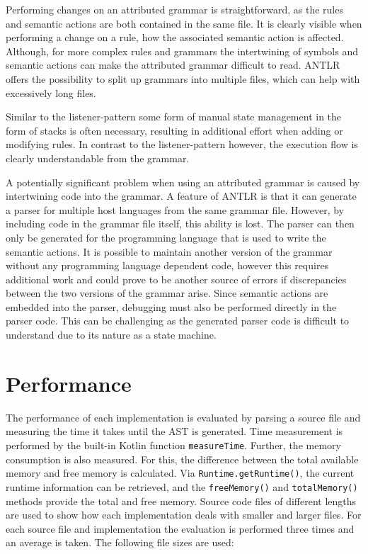 Performing changes on an attributed grammar is straightforward, as the rules and semantic actions are both contained in the same file. It is clearly visible when performing a change on a rule, how the associated semantic action is affected. Although, for more complex rules and grammars the intertwining of symbols and semantic actions can make the attributed grammar difficult to read. ANTLR offers the possibility to split up grammars into multiple files, which can help with excessively long files. 

Similar to the listener-pattern some form of manual state management in the form of stacks is often necessary, resulting in additional effort when adding or modifying rules. In contrast to the listener-pattern however, the execution flow is clearly understandable from the grammar. 

A potentially significant problem when using an attributed grammar is caused by intertwining code into the grammar. A feature of ANTLR is that it can generate a parser for multiple host languages from the same grammar file. However, by including code in the grammar file itself, this ability is lost. The parser can then only be generated for the programming language that is used to write the semantic actions. It is possible to maintain another version of the grammar without any programming language dependent code, however this requires additional work and could prove to be another source of errors if discrepancies between the two versions of the grammar arise. Since semantic actions are embedded into the parser, debugging must also be performed directly in the parser code. This can be challenging as the generated parser code is difficult to understand due to its nature as a state machine.

\section{Performance}

The performance of each implementation is evaluated by parsing a source file and measuring the time it takes until the AST is generated. Time measurement is performed by the built-in Kotlin function \verb|measureTime|. Further, the memory consumption is also measured. For this, the difference between the total available memory and free memory is calculated. Via \verb|Runtime.getRuntime()|, the current runtime information can be retrieved, and the \verb|freeMemory()| and \verb|totalMemory()| methods provide the total and free memory. Source code files of different lengths are used to show how each implementation deals with smaller and larger files. For each source file and implementation the evaluation is performed three times and an average is taken. The following file sizes are used:


